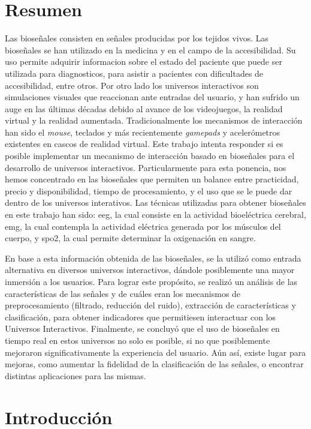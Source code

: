 \documentclass[a4paper]{report}
\begin{document}
\chapter*{Resumen}
Las bioseñales consisten en señales producidas por los tejidos vivos. Las bioseñales se han utilizado en la medicina y en el campo de la accesibilidad. Su uso permite adquirir informacion sobre el estado del paciente que puede ser utilizada para diagnosticos, para asistir a pacientes con dificultades de accesibilidad, entre otros. Por otro lado los universos interactivos son simulaciones visuales que reaccionan ante entradas del usuario, y han sufrido un auge en las últimas décadas debido al avance de los videojuegos, la realidad virtual y la realidad aumentada.  Tradicionalmente los mecanismos de interacción han sido el \emph{mouse}, teclados y más recientemente \emph{gamepads} y acelerómetros existentes en cascos de realidad virtual.  Este trabajo intenta responder si es posible implementar un mecanismo de interacción basado en bioseñales para el desarrollo de universos interactivos.  Particularmente para esta ponencia, nos hemos concentrado en las bioseñales que permiten un balance entre practicidad, precio y disponibilidad, tiempo de procesamiento, y el uso que se le puede dar dentro de los universos interativos. Las técnicas utilizadas para obtener bioseñales en este trabajo han sido: \gls{eeg}, la cual consiste en la actividad bioeléctrica cerebral, \gls{emg}, la cual contempla la actividad eléctrica generada por los músculos del cuerpo, y \gls{spo2}, la cual permite determinar la oxigenación en sangre.

En base a esta información obtenida de las bioseñales, se la utilizó como entrada alternativa en diversos universos interactivos, dándole posiblemente una mayor inmersión a los usuarios. Para lograr este propósito, se realizó un análisis de las características de las señales y de cuáles eran los mecanismos de preprocesamiento (filtrado, reducción del ruido), extracción de características y clasificación, para obtener indicadores que permitiesen interactuar con los Universos Interactivos.  Finalmente, se concluyó que el uso de bioseñales en tiempo real en estos universos no solo es posible, si no que posiblemente mejoraron significativamente la experiencia del usuario. Aún así, existe lugar para mejoras, como aumentar la fidelidad de la clasificación de las señales, o encontrar distintas aplicaciones para las mismas.


\tableofcontents

\chapter{Introducción}

\end{document}

